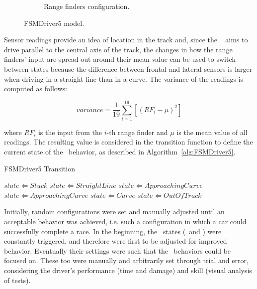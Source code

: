 \begin{figure}
\begin{subfigure}[b]{0.4\textwidth}
   \caption{Range finders configuration.}\label{fig:FSMDriver5Finders}%
\end{subfigure}
   \caption{FSMDriver5 model.}\label{fig:FSMDriver5}
\end{figure}

Sensor readings provide an idea of location in the track and, since the \SL~ aims to drive parallel to the central axis of the track, the changes in how the range finders' input are spread out around their mean value can be used to switch between states because the difference between frontal and lateral sensors is larger when driving in a straight line than in a curve. The variance of the readings is computed as follows:

\begin{equation}
	variance = \frac{1}{19}\sum_{i=1}^{19}[(RF_i-\mu)^2]
\end{equation}

\noindent
where $RF_i$ is the input from the $i$-th range finder and $\mu$ is the mean value of all readings. The resulting value is considered in the transition function to define the current state of the \racing~behavior, as described in Algorithm~\ref{alg:FSMDriver5}.

\begin{algorithm}[h]%
\caption{FSMDriver5 Transition}%
\label{alg:FSMDriver5}%
\begin{algorithmic}
        \STATE $state \Leftarrow Stuck$
    \ELSE
			\STATE $state \Leftarrow StraightLine$
			\STATE $state \Leftarrow ApproachingCurve$
			\STATE $state \Leftarrow ApproachingCurve$
			\STATE $state \Leftarrow Curve$
		\ELSE
			\STATE $state \Leftarrow Out Of Track$
		\ENDIF
	\ENDIF
\end{algorithmic}
\end{algorithm}

Initially, random configurations were set and manually adjusted until an acceptable behavior was achieved, i.e. such a configuration in which a car could successfully complete a race. In the beginning, the \recovery~states (\OT~and \St) were constantly triggered, and therefore were first to be adjusted for improved behavior. Eventually their settings were such that the \racing~behaviors could be focused on. These too were manually and arbitrarily set through trial and error, considering the driver's performance (time and damage) and skill (visual analysis of tests).

